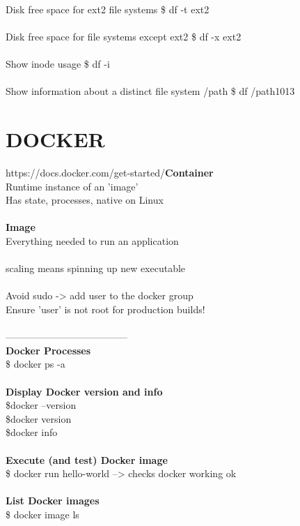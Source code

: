 \documentclass[10pt,a4paper]{article}
\begin{document}
{{{{{{{{{\\
\\
\\
Disk free space for ext2 file systems	\$ df -t ext2\\
\\
Disk free space for file systems except ext2	\$ df -x ext2\\
\\
Show inode usage	\$ df -i\\
\\
Show information about a distinct file system /path	\$ df /path}1013
\hypertarget{docker}{\section {DOCKER}}
https://docs.docker.com/get-started/{\large \textbf{Container}}{\large \\
Runtime instance of an 'image'\\
Has state, processes, native on Linux\\
\\
\textbf{Image}}{\large \\
Everything needed to run an application\\
\\
scaling means spinning up new executable\\
\\
Avoid sudo -> add user to the docker group\\
Ensure 'user' is not root for production builds!\\
\\
--------------------------------------\\
\textbf{Docker Processes}}{\large \\
\$ docker ps -a \\
\\
\textbf{Display Docker version and info}}{\large \\
\$docker --version\\
\$docker version\\
\$docker info\\
\\
\textbf{Execute (and test) Docker image}}{\large \\
\$ docker run hello-world -->  checks docker working ok\\
\\
\textbf{List Docker images}}{\large \\
\$ docker image ls\\
\\
}}}}}}}}}
\end{document}
